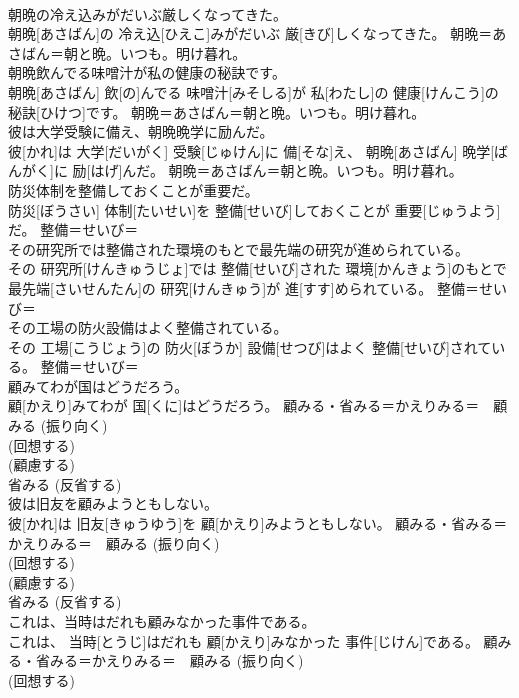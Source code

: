 \documentclass[8pt]{extreport}
\begin{document}
\begin{CJK}{UTF8}{min}
{\\	朝晩の冷え込みがだいぶ厳しくなってきた。	
\\	朝晩[あさばん]の 冷え込[ひえこ]みがだいぶ 厳[きび]しくなってきた。	朝晩＝あさばん＝朝と晩。いつも。明け暮れ。
\\	朝晩飲んでる味噌汁が私の健康の秘訣です。	
\\	朝晩[あさばん] 飲[の]んでる 味噌汁[みそしる]が 私[わたし]の 健康[けんこう]の 秘訣[ひけつ]です。	朝晩＝あさばん＝朝と晩。いつも。明け暮れ。
\\	彼は大学受験に備え、朝晩晩学に励んだ。	
\\	彼[かれ]は 大学[だいがく] 受験[じゅけん]に 備[そな]え、 朝晩[あさばん] 晩学[ばんがく]に 励[はげ]んだ。	朝晩＝あさばん＝朝と晩。いつも。明け暮れ。
\\	防災体制を整備しておくことが重要だ。	
\\	防災[ぼうさい] 体制[たいせい]を 整備[せいび]しておくことが 重要[じゅうよう]だ。	整備＝せいび＝ 
\\	その研究所では整備された環境のもとで最先端の研究が進められている。	
\\	その 研究所[けんきゅうじょ]では 整備[せいび]された 環境[かんきょう]のもとで 最先端[さいせんたん]の 研究[けんきゅう]が 進[すす]められている。	整備＝せいび＝ 
\\	その工場の防火設備はよく整備されている。	
\\	その 工場[こうじょう]の 防火[ぼうか] 設備[せつび]はよく 整備[せいび]されている。	整備＝せいび＝ 
\\	顧みてわが国はどうだろう。	
\\	顧[かえり]みてわが 国[くに]はどうだろう。	顧みる・省みる＝かえりみる＝　{顧みる} (振り向く) 
\\	(回想する) 
\\	(顧慮する) 
\\	{省みる} (反省する) 
\\	彼は旧友を顧みようともしない。	
\\	彼[かれ]は 旧友[きゅうゆう]を 顧[かえり]みようともしない。	顧みる・省みる＝かえりみる＝　{顧みる} (振り向く) 
\\	(回想する) 
\\	(顧慮する) 
\\	{省みる} (反省する) 
\\	これは、当時はだれも顧みなかった事件である。	
\\	これは、 当時[とうじ]はだれも 顧[かえり]みなかった 事件[じけん]である。	顧みる・省みる＝かえりみる＝　{顧みる} (振り向く) 
\\	(回想する) 
}
\end{CJK}
\end{document}
